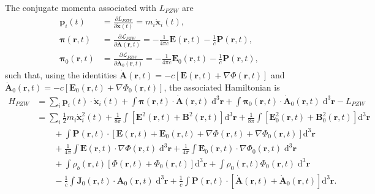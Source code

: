 \documentclass{article}
\begin{document}
The conjugate momenta associated with $L_{PZW}$ are
\begin{equation}
\begin{split}
\mathbf{p}_i(t) &= \frac{\partial L_{PZW}}{\partial \dot{\mathbf{x}}(t)} = m_i\dot{\mathbf{x}}_i(t),\\
\bm{\pi}(\mathbf{r},t) &= \frac{\partial \mathcal{L}_{PZW}}{\partial \dot{\mathbf{A}}(\mathbf{r},t)} = -\frac{1}{4\pi c}\mathbf{E}(\mathbf{r},t) - \frac{1}{c}\mathbf{P}(\mathbf{r},t),\\
\bm{\pi}_0(\mathbf{r},t) &= \frac{\partial \mathcal{L}_{PZW}}{\partial \dot{\mathbf{A}}_0(\mathbf{r},t)} = -\frac{1}{4\pi c}\mathbf{E}_0(\mathbf{r},t) - \frac{1}{c}\mathbf{P}(\mathbf{r},t),
\end{split}
\end{equation}
such that, using the identities $\dot{\mathbf{A}}(\mathbf{r},t) = -c[\mathbf{E}(\mathbf{r},t) + \nabla\Phi(\mathbf{r},t)]$ and $\dot{\mathbf{A}}_0(\mathbf{r},t) = -c[\mathbf{E}_0(\mathbf{r},t) + \nabla\Phi_0(\mathbf{r},t)]$, the associated Hamiltonian is
\begin{equation}
\begin{split}
H_{PZW} &= \sum_i\mathbf{p}_i(t)\cdot\dot{\mathbf{x}}_i(t) + \int\bm{\pi}(\mathbf{r},t)\cdot\dot{\mathbf{A}}(\mathbf{r},t)\;\mathrm{d}^3\mathbf{r} + \int\bm{\pi}_0(\mathbf{r},t)\cdot\dot{\mathbf{A}}_0(\mathbf{r},t)\;\mathrm{d}^3\mathbf{r} - L_{PZW}\\
&= \sum_i\frac{1}{2}m_i\dot{\mathbf{x}}_i^2(t) + \frac{1}{8\pi}\int\left[\mathbf{E}^2(\mathbf{r},t) + \mathbf{B}^2(\mathbf{r},t)\right]\mathrm{d}^3\mathbf{r} + \frac{1}{8\pi}\int\left[\mathbf{E}_0^2(\mathbf{r},t) + \mathbf{B}_0^2(\mathbf{r},t)\right]\mathrm{d}^3\mathbf{r}\\
&\qquad+\int\mathbf{P}(\mathbf{r},t)\cdot\left[\mathbf{E}(\mathbf{r},t) + \mathbf{E}_0(\mathbf{r},t) + \nabla\Phi(\mathbf{r},t) + \nabla\Phi_0(\mathbf{r},t)\right]\mathrm{d}^3\mathbf{r}\\
&\qquad+ \frac{1}{4\pi}\int\mathbf{E}(\mathbf{r},t)\cdot\nabla\Phi(\mathbf{r},t)\;\mathrm{d}^3\mathbf{r} + \frac{1}{4\pi}\int\mathbf{E}_0(\mathbf{r},t)\cdot\nabla\Phi_0(\mathbf{r},t)\;\mathrm{d}^3\mathbf{r}\\
&\qquad+ \int\rho_b(\mathbf{r},t)\left[\Phi(\mathbf{r},t) + \Phi_0(\mathbf{r},t)\right]\mathrm{d}^3\mathbf{r} + \int\rho_0(\mathbf{r},t)\Phi_0(\mathbf{r},t)\;\mathrm{d}^3\mathbf{r}\\
&\qquad - \frac{1}{c}\int\mathbf{J}_0(\mathbf{r},t)\cdot\mathbf{A}_0(\mathbf{r},t)\;\mathrm{d}^3\mathbf{r} + \frac{1}{c}\int\mathbf{P}(\mathbf{r},t)\cdot\left[\dot{\mathbf{A}}(\mathbf{r},t) + \dot{\mathbf{A}}_0(\mathbf{r},t)\right]\mathrm{d}^3\mathbf{r}.
\end{split}
\end{equation}
\end{document}
